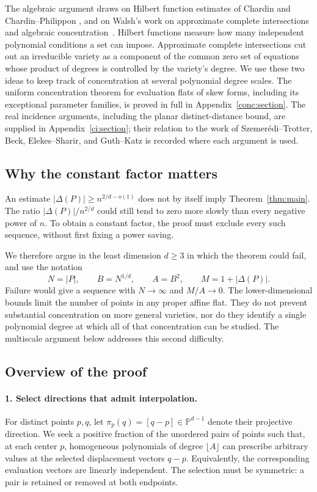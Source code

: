 The algebraic argument draws on Hilbert function estimates of Chardin
and Chardin--Philippon
\cite{chardin1989,chardinphilippon1999,chardinphilippon2002erratum},
and on Walsh's work on approximate complete intersections and
algebraic concentration~\cite{walsh2020,walsh2023}.
Hilbert functions measure how many independent
polynomial conditions a set can impose. Approximate complete
intersections cut out an irreducible variety as a component of the
common zero set of equations whose product of degrees is controlled
by the variety's degree.
We use these two ideas to keep track of concentration at several
polynomial degree scales. The uniform concentration theorem for
evaluation flats of skew forms, including its exceptional parameter
families, is proved in full in Appendix~\ref{conc:section}.
The real incidence arguments, including the planar distinct-distance
bound, are supplied in Appendix~\ref{ci:section}; their relation to
the work of Szemer\'edi--Trotter, Beck, Elekes--Sharir, and Guth--Katz
is recorded where each argument is used.

\subsection{Why the constant factor matters}

An estimate \(|\Delta(P)|\ge n^{2/d-o(1)}\) does not by itself imply
Theorem~\ref{thm:main}. The ratio \(|\Delta(P)|/n^{2/d}\) could still
tend to zero more slowly than every negative power of \(n\).
To obtain a constant factor, the proof must exclude every such
sequence, without first fixing a power saving.

We therefore argue in the least dimension \(d\ge3\) in which the
theorem could fail, and use the notation
\[
 N=|P|,\qquad B=N^{1/d},\qquad A=B^2,\qquad
 M=1+|\Delta(P)|.
\]
Failure would give a sequence with \(N\to\infty\) and \(M/A\to0\).
The lower-dimensional bounds limit the number of points in any
proper affine flat. They do not prevent substantial concentration
on more general varieties, nor do they identify a single polynomial
degree at which all of that concentration can be studied.
The multiscale argument below addresses this second difficulty.

\subsection{Overview of the proof}

\paragraph{1. Select directions that admit interpolation.}
For distinct points \(p,q\), let
\(\pi_p(q)=[q-p]\in\mathbb P^{d-1}\) denote their projective direction.
We seek a positive fraction of the unordered pairs of points such
that, at each center \(p\), homogeneous polynomials of degree
\(\lfloor A\rfloor\) can prescribe arbitrary values at the selected
displacement vectors \(q-p\). Equivalently, the corresponding evaluation
vectors are linearly independent. The selection must be symmetric:
a pair is retained or removed at both endpoints.

